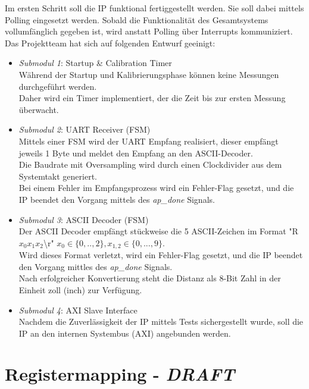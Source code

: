 Im ersten Schritt soll die IP funktional fertiggestellt werden. Sie soll dabei mittels Polling eingesetzt werden. Sobald die Funktionalität des Gesamtsystems vollumfänglich gegeben ist, wird anstatt Polling über Interrupts kommuniziert.\newline
\newline
Das Projektteam hat sich auf folgenden Entwurf geeinigt:

\begin{itemize}
    \item \textit{Submodul 1}: Startup \& Calibration Timer \\
    Während der Startup und Kalibrierungsphase können keine Messungen durchgeführt werden.\\
    Daher wird ein Timer implementiert, der die Zeit bis zur ersten Messung überwacht.
    \item \textit{Submodul 2}: UART Receiver (FSM) \\
    Mittels einer FSM wird der UART Empfang realisiert, dieser empfängt jeweils 1 Byte und meldet den Empfang an den ASCII-Decoder.\\
    Die Baudrate mit Oversampling wird durch einen Clockdivider aus dem Systemtakt generiert.\\
    Bei einem Fehler im Empfangsprozess wird ein Fehler-Flag gesetzt, und die IP beendet den Vorgang mittels des \textit{ap\_done} Signals.
    \item \textit{Submodul 3}: ASCII Decoder (FSM) \\
    Der ASCII Decoder empfängt stückweise die 5 ASCII-Zeichen im Format "R$x_0 x_ 1 x_ 2$\textbackslash r"
    \newline $x_0 \in \{ 0,..,2\}, x_{1,2} \in \{ 0,...,9 \}$.\\
    Wird dieses Format verletzt, wird ein Fehler-Flag gesetzt, und die IP beendet den Vorgang mittles des \textit{ap\_done} Signals.\\
    Nach erfolgreicher Konvertierung steht die Distanz als 8-Bit Zahl in der Einheit zoll (inch) zur Verfügung.
    \item \textit{Submodul 4}: AXI Slave Interface  \\
    Nachdem die Zuverlässigkeit der IP mittels Tests sichergestellt wurde, soll die IP an den internen Systembus (AXI) angebunden werden.
\end{itemize}

\section{Registermapping - \textit{DRAFT}}

